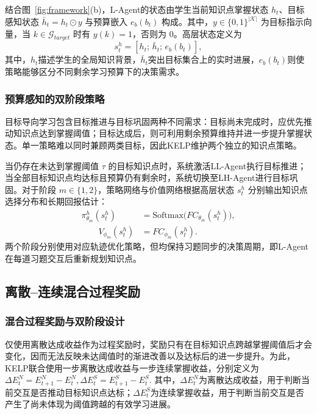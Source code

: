 \documentclass[11pt,a4paper]{article}
\begin{document}
结合图~\ref{fig:framework}(b)，L-Agent的状态由学生当前知识点掌握状态 $h_t$、目标感知状态 $\bar{h}_t=h_t\odot y$ 与预算嵌入 $e_b(b_t)$ 构成。其中，$y\in\{0,1\}^{|\mathcal{K}|}$ 为目标指示向量，当 $k\in\mathcal{G}_{target}$ 时有 $y(k)=1$，否则为 $0$。高层状态定义为
\begin{equation}
s_t^h=[h_t;\,\bar{h}_t;\,e_b(b_t)],
\end{equation}
其中，$h_t$描述学生的全局知识背景，$\bar{h}_t$突出目标集合上的实时进展，$e_b(b_t)$则使策略能够区分不同剩余学习预算下的决策需求。

\subsubsection{预算感知的双阶段策略}

目标导向学习包含目标推进与目标巩固两种不同需求：目标尚未完成时，应优先推动知识点达到掌握阈值；目标达成后，则可利用剩余预算维持并进一步提升掌握状态。单一策略难以同时兼顾两类目标，因此KELP维护两个独立的知识点策略。

当仍存在未达到掌握阈值 $\tau$ 的目标知识点时，系统激活LL-Agent执行目标推进；当全部目标知识点均达标且预算仍有剩余时，系统切换至LH-Agent进行目标巩固。对于阶段 $m\in\{1,2\}$，策略网络与价值网络根据高层状态 $s_t^h$ 分别输出知识点选择分布和长期回报估计：
\begin{equation}
\begin{aligned}
\pi_{\theta_m}^h( s_t^h)
&=
\mathrm{Softmax}\!\big(FC_{\theta_m}(s_t^h)\big),\\
\qquad
V_{\phi_m}(s_t^h)&=FC_{\phi_m}(s_t^h).
\end{aligned}
\end{equation}
两个阶段分别使用对应轨迹优化策略，但均保持习题同步的决策周期，即L-Agent在每道习题交互后重新规划知识点。

\subsection{离散--连续混合过程奖励}

\subsubsection{混合过程奖励与双阶段设计}

仅使用离散达成收益作为过程奖励时，奖励只有在目标知识点跨越掌握阈值后才会变化，因而无法反映未达阈值时的渐进改善以及达标后的进一步提升。为此，KELP联合使用一步离散达成收益与一步连续掌握收益，分别定义为
$
\Delta E_t^{N}=E_{t+1}^{N}-E_t^{N},
\Delta E_t^{S}=E_{t+1}^{S}-E_t^{S}.
$
其中，$\Delta E_t^{N}$为离散达成收益，用于判断当前交互是否推动目标知识点达标；$\Delta E_t^{S}$为连续掌握收益，用于判断当前交互是否产生了尚未体现为阈值跨越的有效学习进展。
\end{document}
